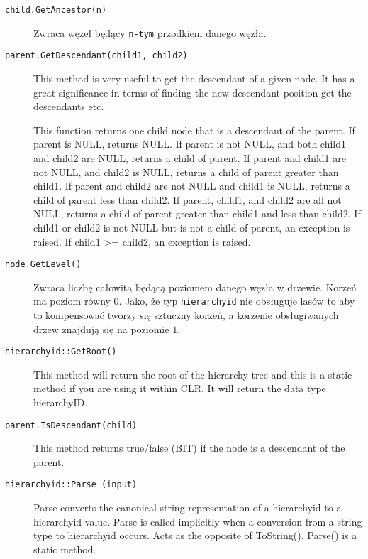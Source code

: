 \begin{description}
  \item[\texttt{child.GetAncestor(n)}] 
    Zwraca węzeł będący \texttt{n-tym} przodkiem danego węzła.

  \item[\texttt{parent.GetDescendant(child1, child2)}] 
	This method is very useful to get the descendant of a given node. 
	It has a great significance in terms of finding the new descendant position get the descendants etc. 

	This function returns one child node that is a descendant of the parent. 
	If parent is NULL, returns NULL. 
	If parent is not NULL, and both child1 and child2 are NULL, returns a child of parent. 
	If parent and child1 are not NULL, and child2 is NULL, returns a child of parent greater than child1. 
	If parent and child2 are not NULL and child1 is NULL, returns a child of parent less than child2. 
	If parent, child1, and child2 are all not NULL, returns a child of parent greater than child1 and less than child2. 
	If child1 or child2 is not NULL but is not a child of parent, an exception is raised. 
	If child1 >= child2, an exception is raised.

  \item[\texttt{node.GetLevel()}] 
	Zwraca liczbę całowitą będącą poziomem danego węzła w drzewie. 
	Korzeń ma poziom równy $0$. 
	Jako, że typ \texttt{hierarchyid} nie obsługuje lasów to aby to kompensować tworzy się sztuczny korzeń, a korzenie obsługiwanych drzew znajdują się na poziomie $1$.


  \item[\texttt{hierarchyid::GetRoot()}] 
	This method will return the root of the hierarchy tree and this is a static method if you are using it within CLR. 
	It will return the data type hierarchyID. 

  \item[\texttt{parent.IsDescendant(child)}] 
	This method returns true/false (BIT) if the node is a descendant of the parent. 

  \item[\texttt{hierarchyid::Parse (input)}] 
	Parse converts the canonical string representation of a hierarchyid to a hierarchyid value. 
	Parse is called implicitly when a conversion from a string type to hierarchyid occurs. 
	Acts as the opposite of ToString(). 
	Parse() is a static method. 


\end{description}
